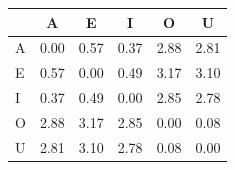 \begin{tabular}{lccccc}
\toprule
\rowcolor{col01}
 & A & E & I & O & U \\
\midrule
A & 0.00 & 0.57 & 0.37 & 2.88 & 2.81 \\
E & 0.57 & 0.00 & 0.49 & 3.17 & 3.10 \\
I & 0.37 & 0.49 & 0.00 & 2.85 & 2.78 \\
O & 2.88 & 3.17 & 2.85 & 0.00 & 0.08 \\
U & 2.81 & 3.10 & 2.78 & 0.08 & 0.00 \\
\bottomrule
\end{tabular}
